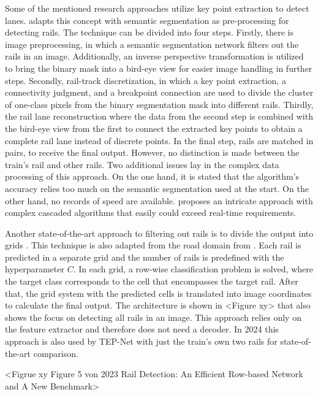 Some of the mentioned research approaches utilize key point extraction to detect lanes.
\cite{topologyGuidedRailDetection2022} adapts this concept with semantic segmentation as pre-processing for detecting rails.
The technique can be divided into four steps.
Firstly, there is image preprocessing, in which a semantic segmentation network filters out the rails in an image.
Additionally, an inverse perspective transformation is utilized to bring the binary mask into a bird-eye view for easier image handling in further steps.
Secondly, rail-track discretization, in which a key point extraction, a connectivity judgment, and a breakpoint connection are used to divide the cluster of one-class pixels from the binary segmentation mask into different rails.
Thirdly, the rail lane reconstruction where the data from the second step is combined with the bird-eye view from the first to connect the extracted key points to obtain a complete rail lane instead of discrete points.
In the final step, rails are matched in pairs, to receive the final output.
However, no distinction is made between the train's rail and other rails.
Two additional issues lay in the complex data processing of this approach.
On the one hand, it is stated that the algorithm's accuracy relies too much on the semantic segmentation used at the start.
On the other hand, no records of speed are available.
\cite{topologyGuidedRailDetection2022} proposes an intricate approach with complex cascaded algorithms that easily could exceed real-time requirements.


Another state-of-the-art approach to filtering out rails is to divide the output into grids \cite{li2022rail}.
This technique is also adapted from the road domain from \cite{laneDetectionGrid2020}.
Each rail is predicted in a separate grid and the number of rails is predefined with the hyperparameter $C$.
In each grid, a row-wise classification problem is solved, where the target class corresponds to the cell that encompasses the target rail.
After that, the grid system with the predicted cells is translated into image coordinates to calculate the final output.
The architecture is shown in <Figure xy> that also shows the focus on detecting all rails in an image.
This approach relies only on the feature extractor and therefore does not need a decoder.
In 2024 this approach is also used by TEP-Net \cite{tepNet2024} with just the train's own two rails for state-of-the-art comparison.

<Figrue xy Figure 5 von 2023 Rail Detection: An Efficient Row-based Network and A New Benchmark>


